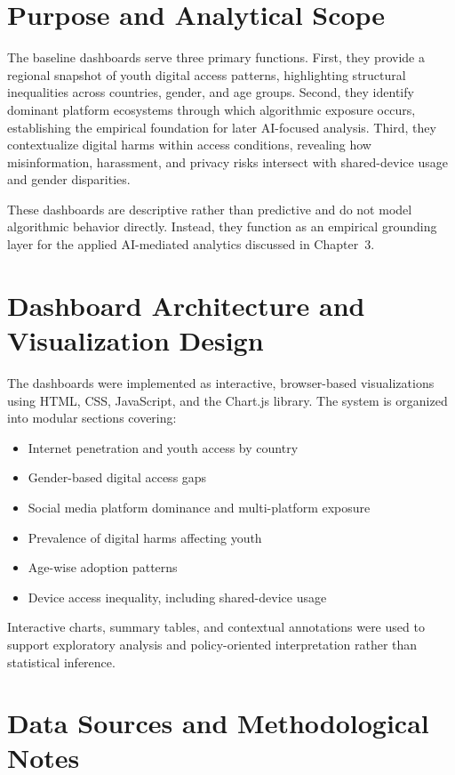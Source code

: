 \documentclass[12pt,a4paper]{report}
\begin{document}
\section{Purpose and Analytical Scope}

The baseline dashboards serve three primary functions. First, they provide a regional snapshot of youth digital access patterns, highlighting structural inequalities across countries, gender, and age groups. Second, they identify dominant platform ecosystems through which algorithmic exposure occurs, establishing the empirical foundation for later AI-focused analysis. Third, they contextualize digital harms within access conditions, revealing how misinformation, harassment, and privacy risks intersect with shared-device usage and gender disparities.

These dashboards are descriptive rather than predictive and do not model algorithmic behavior directly. Instead, they function as an empirical grounding layer for the applied AI-mediated analytics discussed in Chapter~3.

\section{Dashboard Architecture and Visualization Design}

The dashboards were implemented as interactive, browser-based visualizations using HTML, CSS, JavaScript, and the Chart.js library. The system is organized into modular sections covering:

\begin{itemize}
  \item Internet penetration and youth access by country
  \item Gender-based digital access gaps
  \item Social media platform dominance and multi-platform exposure
  \item Prevalence of digital harms affecting youth
  \item Age-wise adoption patterns
  \item Device access inequality, including shared-device usage
\end{itemize}

Interactive charts, summary tables, and contextual annotations were used to support exploratory analysis and policy-oriented interpretation rather than statistical inference.

\section{Data Sources and Methodological Notes}
\end{document}
